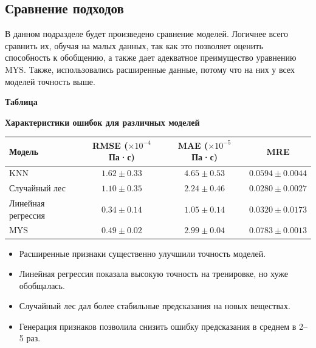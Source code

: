 \documentclass[a4paper,12pt]{article}
\newcommand{\TableNumberRight}{
  \refstepcounter{table}%
  \noindent\hfill\textbf{Таблица \thetable}
}
\begin{document}
  \subsection{Сравнение подходов}

    В данном подразделе будет произведено сравнение моделей. Логичнее всего сравнить их, обучая на малых данных, так как это позволяет оценить способность к обобщению, а также дает адекватное преимущество уравнению MYS. Также, использовались расширенные данные, потому что на них у всех моделей точность выше.  

  \begin{table}[ht!]
    \TableNumberRight
    \begin{center}
      \textbf{Характеристики ошибок для различных моделей}
      \vspace*{\fill}
    \end{center}
    
    \vspace{0.8ex}
    \noindent

    \begin{tabular}{|l|c|c|c|}
        \hline
        \textbf{Модель} & \textbf{RMSE} (\(\times 10^{-4}\) Па·с) & \textbf{MAE} (\(\times 10^{-5}\) Па·с) & \textbf{MRE} \\
        \hline
        KNN & \( 1.62 \pm 0.33 \) & \( 4.65 \pm 0.53 \) & \( 0.0594 \pm 0.0044 \) \\
        Случайный лес & \( 1.10 \pm 0.35 \) & \( 2.24 \pm 0.46 \) & \( 0.0280 \pm 0.0027 \) \\
        Линейная регрессия & \( 0.34 \pm 0.14 \) & \( 1.05 \pm 0.14 \) & \( 0.0320 \pm 0.0173 \) \\
        MYS & \( 0.49 \pm 0.02 \) & \( 2.99 \pm 0.04 \) & \( 0.0783 \pm 0.0013 \) \\
        \hline
    \end{tabular}
  \end{table}

  \begin{itemize}
    \item Расширенные признаки существенно улучшили точность моделей.
    \item Линейная регрессия показала высокую точность на тренировке, но хуже обобщалась.
    \item Случайный лес дал более стабильные предсказания на новых веществах.
    \item Генерация признаков позволила снизить ошибку предсказания в среднем в 2--5 раз.
  \end{itemize}
\end{document}
